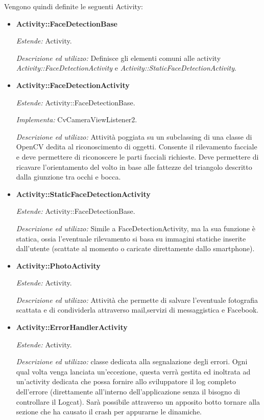 Vengono quindi definite le seguenti Activity:
\begin{itemize}

\item \textbf{Activity::FaceDetectionBase}

\textit{Estende:} Activity.

\textit{Descrizione ed utilizzo:} Definisce gli elementi comuni alle activity \textit{Activity::FaceDetectionActivity} e \textit{Activity::StaticFaceDetectionActivity}.


\item \textbf{Activity::FaceDetectionActivity}

\textit{Estende:} Activity::FaceDetectionBase.

\textit{Implementa:} CvCameraViewListener2.

\textit{Descrizione ed utilizzo:} Attività poggiata su un subclassing di una classe di OpenCV dedita al riconoscimento di oggetti. Consente il rilevamento facciale e deve permettere di riconoscere le parti facciali richieste. Deve permettere di ricavare l'orientamento del volto in base alle fattezze del triangolo descritto dalla giunzione tra occhi e bocca.

\item \textbf{Activity::StaticFaceDetectionActivity}

\textit{Estende:} Activity::FaceDetectionBase.

\textit{Descrizione ed utilizzo:} Simile a FaceDetectionActivity, ma la sua funzione è statica, ossia l'eventuale rilevamento si basa su immagini statiche inserite dall'utente (scattate al momento o caricate direttamente dallo smartphone).

\item \textbf{Activity::PhotoActivity}

\textit{Estende:} Activity.

\textit{Descrizione ed utilizzo:} Attività che permette di salvare l'eventuale fotografia scattata e di condividerla attraverso mail,servizi di messaggistica e Facebook.

\item \textbf{Activity::ErrorHandlerActivity}

\textit{Estende:} Activity.

\textit{Descrizione ed utilizzo:} classe dedicata alla segnalazione degli errori. Ogni qual volta venga lanciata un'eccezione, questa verrà gestita ed inoltrata ad un'activity dedicata che possa fornire allo sviluppatore il log completo dell'errore (direttamente all'interno dell'applicazione senza il bisogno di controllare il Logcat). Sarà possibile attraverso un apposito botto tornare alla sezione che ha causato il crash per appurarne le dinamiche.



\end{itemize}
